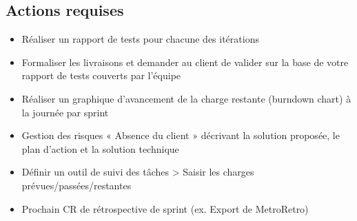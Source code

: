 \documentclass{article}
\begin{document}
\subsection{Actions requises}
\begin{itemize}
    \item Réaliser un rapport de tests pour chacune des itérations
    \item Formaliser les livraisons et demander au client de valider sur la base de votre rapport de tests couverts par l’équipe
    \item Réaliser un graphique d’avancement de la charge restante (burndown chart) à la journée par sprint
    \item Gestion des risques « Absence du client » décrivant la solution proposée, le plan d’action et la solution technique
    \item Définir un outil de suivi des tâches > Saisir les charges prévues/passées/restantes
    \item Prochain CR de rétrospective de sprint (ex. Export de MetroRetro)
\end{itemize}

\newpage
\end{document}
